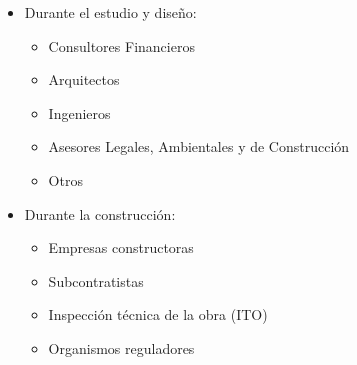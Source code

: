 \documentclass{article} %
\begin{document}
\begin{itemize}[label={},left=0pt,align=parleft]
    \item \begin{highlightbox}[levelone] Durante el estudio y diseño: \end{highlightbox}
    \begin{itemize}[label={},left=1em,align=parleft]
        \item \begin{highlightbox}[leveltwo] Consultores Financieros \end{highlightbox}
        \item \begin{highlightbox}[leveltwo] Arquitectos \end{highlightbox}
        \item \begin{highlightbox}[leveltwo] Ingenieros \end{highlightbox}
        \item \begin{highlightbox}[leveltwo] Asesores Legales, Ambientales y de Construcción \end{highlightbox}
        \item \begin{highlightbox}[leveltwo] Otros \end{highlightbox}
    \end{itemize}
    \item \begin{highlightbox}[levelone] Durante la construcción: \end{highlightbox}
    \begin{itemize}[label={},left=1em,align=parleft]
        \item \begin{highlightbox}[leveltwo] Empresas constructoras \end{highlightbox}
        \item \begin{highlightbox}[leveltwo] Subcontratistas \end{highlightbox}
        \item \begin{highlightbox}[leveltwo] Inspección técnica de la obra (ITO) \end{highlightbox}
        \item \begin{highlightbox}[leveltwo] Organismos reguladores \end{highlightbox}

\end{itemize}
\end{itemize}
\end{document}
